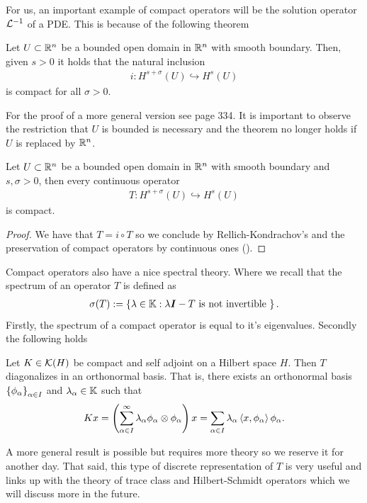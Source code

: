 \documentclass[
    a4paper,
    DIV=14,
    abstract=true,
    numbers=noenddot
]{scrartcl}
\begin{document}
	For us, an important example of compact operators will be the solution operator $\mathcal{L}^{-1}$ of a PDE. This is because of the following theorem
	\begin{theorem}\label{Rellich} Let $U \subset \mathbb{R}^n$ be a bounded open domain in $\mathbb{R}^n$ with smooth boundary. Then, given $s >0$ it holds that the natural inclusion
		\begin{align*}
			i: H^{s+ \sigma }(U) \hookrightarrow H^s(U)
		\end{align*}
		is compact for all $\sigma >0$.
	\end{theorem}
	For the proof of a more general version see \cite{taylor2013partial} page 334. It is important to observe the restriction that $U$ is bounded is necessary and the theorem no longer holds if  $U$ is replaced by  $\mathbb{R}^n$.
	\begin{corollary}\label{addd}
		Let $U \subset \mathbb{R}^n$ be a bounded open domain in $\mathbb{R}^n$ with smooth boundary and $s, \sigma >0$, then every continuous operator
		\begin{align*}
			T:H^{s+ \sigma }(U) \hookrightarrow H^s(U)
		\end{align*}
		is compact.
	\end{corollary}
	\begin{proof}
		We have that $T= i \circ T$ so we conclude by Rellich-Kondrachov's  and the preservation of compact operators by continuous ones ().
	\end{proof}
	Compact operators also have a nice spectral theory. Where we recall that
	the spectrum of an operator $T$ is defined as
	\begin{align*}
		\sigma (T):=\left\{\lambda \in \mathbb{K}: \lambda {\bm{I}} -T \text{ is not invertible } \right\} .
	\end{align*}
	Firstly, the spectrum of a compact operator is equal
	to it's eigenvalues. Secondly the following holds
	\begin{theorem} Let $K \in \mathcal{K}(H)$ be compact and self adjoint on a Hilbert space $H$. Then  $T$ diagonalizes in an orthonormal basis. That is, there exists an orthonormal basis $\left\{\phi_\alpha\right\} _{\alpha \in  I}$  and $\lambda _\alpha \in \mathbb{K}$ such that
		\begin{align*}
			Kx=\left(\sum_{\alpha \in I}^{\infty} \lambda _\alpha \phi_\alpha\otimes \phi_\alpha\right) x  =\sum_{\alpha \in  I} \lambda _\alpha \left\langle x,\phi_\alpha\right\rangle\phi_\alpha .
		\end{align*}
	\end{theorem}
	A more general result is possible but requires more theory so we reserve
	it for another day. That said, this type of discrete representation of
	$T$ is very useful and links up with the theory of trace class and
	Hilbert-Schmidt operators which we will discuss more in the future.
\end{document}
